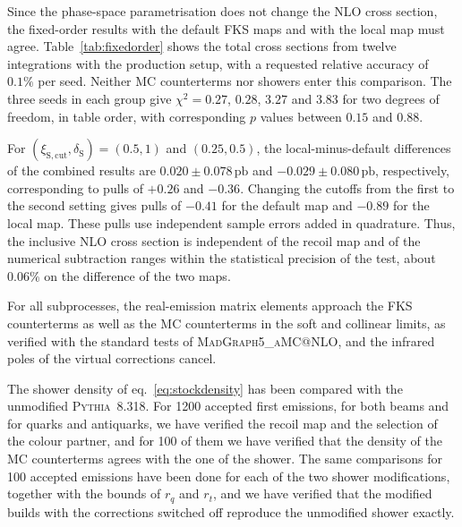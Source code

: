 \documentclass[a4paper,11pt]{article}
\makeatletter
\newcommand{\pb}{\ensuremath{\,\text{pb}}}
\newcommand{\mgamc}{\textsc{MadGraph5\_aMC@NLO}\xspace}
\makeatother
\begin{document}
Since the phase-space parametrisation does not change the NLO cross
section, the fixed-order results with the default FKS maps and with
the local map must agree. Table~\ref{tab:fixedorder} shows the total
cross sections from twelve integrations with the production setup,
with a requested relative accuracy of $0.1\%$ per seed. Neither MC
counterterms nor showers enter this comparison. The three seeds in
each group give $\chi^2=0.27$, $0.28$, $3.27$ and $3.83$ for two
degrees of freedom, in table order, with corresponding $p$ values
between $0.15$ and $0.88$.

For $(\xi_{\mathrm{S,cut}},\delta_{\mathrm S})=(0.5,1)$ and
$(0.25,0.5)$, the local-minus-default differences of the combined
results are $0.020\pm0.078\pb$ and $-0.029\pm0.080\pb$, respectively,
corresponding to pulls of $+0.26$ and $-0.36$. Changing the cutoffs
from the first to the second setting gives pulls of $-0.41$ for the
default map and $-0.89$ for the local map. These pulls use independent
sample errors added in quadrature. Thus, the inclusive NLO cross
section is independent of the recoil map and of the numerical
subtraction ranges within the statistical precision of the test,
about $0.06\%$ on the difference of the two maps.

For all subprocesses, the real-emission matrix elements approach the
FKS counterterms as well as the MC counterterms in the soft and
collinear limits, as verified with the standard tests of \mgamc, and
the infrared poles of the virtual corrections cancel.

The shower density of eq.~\eqref{eq:stockdensity} has been compared
with the unmodified \textsc{Pythia}~8.318. For 1200 accepted first emissions,
for both beams and for quarks and antiquarks, we have verified the
recoil map and the selection of the colour partner, and for 100 of
them we have verified that the density of the MC counterterms agrees
with the one of the shower. The same comparisons for 100 accepted
emissions have been done for each of the two shower modifications,
together with the bounds of $r_q$ and $r_t$, and we have verified that
the modified builds with the corrections switched off reproduce the
unmodified shower exactly.
\end{document}
